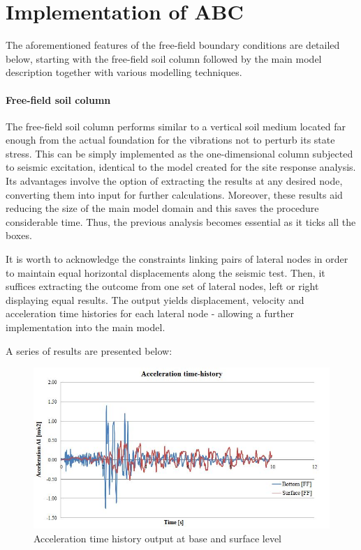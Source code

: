 \section{Implementation of ABC} \label{implemenent}
The aforementioned features of the free-field boundary conditions are detailed below, starting with the free-field soil column followed by the main model description together with various modelling techniques. 
	\paragraph{Free-field soil column}
	The free-field soil column performs similar to a vertical soil medium located far enough from the actual foundation for the vibrations not to perturb its state stress. This can be simply implemented as the one-dimensional column subjected to seismic excitation, identical to the model created for the site response analysis. Its advantages involve the option of extracting the results at any desired node, converting them into input for further calculations. Moreover, these results aid reducing the size of the main model domain and this saves the procedure considerable time. Thus, the previous analysis becomes essential as it ticks all the boxes. 
	
	It is worth to acknowledge the constraints linking pairs of lateral nodes in order to maintain equal horizontal displacements along the seismic test. Then, it suffices extracting the outcome from one set of lateral nodes, left or right displaying equal results. The output yields displacement, velocity and acceleration time histories for each lateral node - allowing a further implementation into the main model.
	
	A series of results are presented below:
		\begin{figure}[h!]
			\centering
			\includegraphics[width=0.7\linewidth]{"acc_FF"}
			\caption{Acceleration time history output at base and surface level}
			\label{Acc_ff}
		\end{figure} 
		

